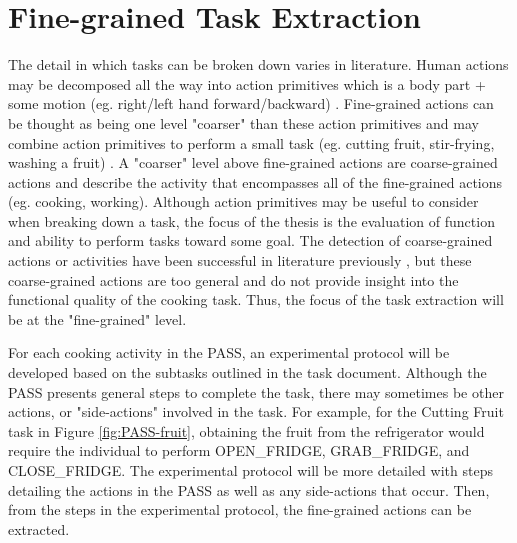 \section{Fine-grained Task Extraction}
The detail in which tasks can be broken down varies in literature. Human actions may be decomposed all the way into action primitives which is a body part + some motion (eg. right/left hand forward/backward) \cite{huszHumanActivityRecognition2007}. Fine-grained actions can be thought as being one level "coarser" than these action primitives and may combine action primitives to perform a small task (eg. cutting fruit, stir-frying, washing a fruit)  \cite{pan_fine-grained_2020}. A "coarser" level above fine-grained actions are coarse-grained actions and describe the activity that encompasses all of the fine-grained actions (eg. cooking, working). Although action primitives may be useful to consider when breaking down a task, the focus of the thesis is the evaluation of function and ability to perform tasks toward some goal. The detection of coarse-grained actions or activities have been successful in literature previously \cite{cook_learning_2010}, but these coarse-grained actions are too general and do not provide insight into the functional quality of the cooking task. Thus, the focus of the task extraction will be at the "fine-grained" level. 

For each cooking activity in the PASS, an experimental protocol will be developed based on the subtasks outlined in the task document. Although the PASS presents general steps to complete the task, there may sometimes be other actions, or "side-actions" involved in the task. For example, for the Cutting Fruit task in Figure \ref{fig:PASS-fruit}, obtaining the fruit from the refrigerator would require the individual to perform OPEN\_FRIDGE, GRAB\_FRIDGE, and CLOSE\_FRIDGE. The experimental protocol will be more detailed with steps detailing the actions in the PASS as well as any side-actions that occur. Then, from the steps in the experimental protocol, the fine-grained actions can be extracted.



